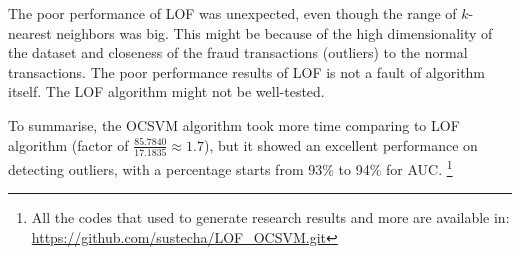 The poor performance of LOF was unexpected, even though the range of $k$-nearest neighbors was big. This might be because of the high dimensionality of the dataset and closeness of the fraud transactions (outliers) to the normal transactions. The poor performance results of LOF is not a fault of algorithm itself. The LOF algorithm might not be well-tested.

To summarise, the OCSVM algorithm took more time comparing to LOF algorithm (factor of $\frac{85.7840}{17.1835} \approx 1.7$), but it showed an excellent performance on detecting outliers, with a percentage starts from 93$\%$ to 94$\%$ for AUC. \footnote{All the codes that used to generate research results and more are available in: \url{https://github.com/sustecha/LOF_OCSVM.git}}
